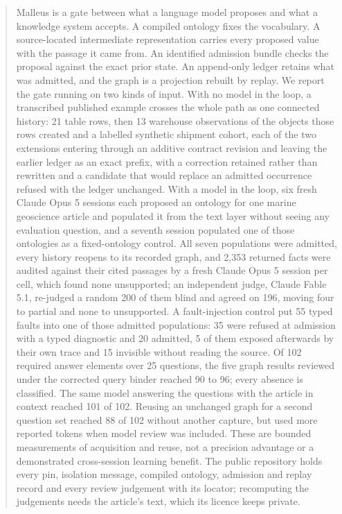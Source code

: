 \maketitle

\begin{abstract}

Malleus is a gate between what a language model proposes and what a knowledge system accepts. A compiled ontology fixes the vocabulary. A source-located intermediate representation carries every proposed value with the passage it came from. An identified admission bundle checks the proposal against the exact prior state. An append-only ledger retains what was admitted, and the graph is a projection rebuilt by replay. We report the gate running on two kinds of input. With no model in the loop, a transcribed published example crosses the whole path as one connected history: 21 table rows, then 13 warehouse observations of the objects those rows created and a labelled synthetic shipment cohort, each of the two extensions entering through an additive contract revision and leaving the earlier ledger as an exact prefix, with a correction retained rather than rewritten and a candidate that would replace an admitted occurrence refused with the ledger unchanged. With a model in the loop, six fresh Claude Opus 5 sessions each proposed an ontology for one marine geoscience article and populated it from the text layer without seeing any evaluation question, and a seventh session populated one of those ontologies as a fixed-ontology control. All seven populations were admitted, every history reopens to its recorded graph, and 2,353 returned facts were audited against their cited passages by a fresh Claude Opus 5 session per cell, which found none unsupported; an independent judge, Claude Fable 5.1, re-judged a random 200 of them blind and agreed on 196, moving four to partial and none to unsupported. A fault-injection control put 55 typed faults into one of those admitted populations: 35 were refused at admission with a typed diagnostic and 20 admitted, 5 of them exposed afterwards by their own trace and 15 invisible without reading the source. Of 102 required answer elements over 25 questions, the five graph results reviewed under the corrected query binder reached 90 to 96; every absence is classified. The same model answering the questions with the article in context reached 101 of 102. Reusing an unchanged graph for a second question set reached 88 of 102 without another capture, but used more reported tokens when model review was included. These are bounded measurements of acquisition and reuse, not a precision advantage or a demonstrated cross-session learning benefit. The public repository holds every pin, isolation message, compiled ontology, admission and replay record and every review judgement with its locator; recomputing the judgements needs the article's text, which its licence keeps private.

\end{abstract}

